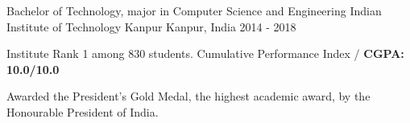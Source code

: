 


\begin{cventries}


\cventry
{Bachelor of Technology, major in Computer Science and Engineering} %
{Indian Institute of Technology Kanpur} %
{Kanpur, India} %
{2014 - 2018} %
{%
\begin{cvitems}
\setlength\itemsep{0.1cm}
\item {Institute Rank 1 among 830 students. Cumulative Performance Index /
    \textbf{CGPA: 10.0/10.0}}
\item {Awarded the President's Gold Medal, the highest academic award, by the Honourable President of India.}
\end{cvitems}
}

\end{cventries}

